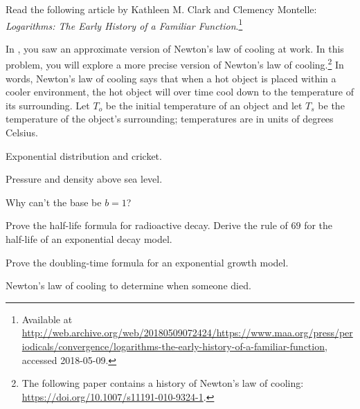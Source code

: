 \documentclass[a4paper,oneside,12pt]{article}
\begin{document}
\begin{problem}
\item Read the following article by Kathleen M. Clark and Clemency
  Montelle:
  \emph{Logarithms: The Early History of a Familiar Function}.\footnote{
    Available at
    \url{http://web.archive.org/web/20180509072424/https://www.maa.org/press/periodicals/convergence/logarithms-the-early-history-of-a-familiar-function},
    accessed 2018-05-09.
  }

\item In , you saw an approximate
  version of Newton's law of cooling at work.  In this problem, you
  will explore a more precise version of Newton's law of
  cooling.\footnote{
    The following paper contains a history of Newton's law of cooling:
    \url{https://doi.org/10.1007/s11191-010-9324-1}.
  }
  In words, Newton's law of cooling says that when a hot object is
  placed within a cooler environment, the hot object will over time
  cool down to the temperature of its surrounding.  Let $T_o$ be the
  initial temperature of an object and let $T_s$ be the temperature of
  the object's surrounding; temperatures are in units of degrees
  Celsius.

\item Exponential distribution and cricket.

\item Pressure and density above sea level.

\item Why can't the base be $b = 1$?

\item Prove the half-life formula for radioactive decay.  Derive the
  rule of $69$ for the half-life of an exponential decay model.

\item Prove the doubling-time formula for an exponential growth
  model.

\item Newton's law of cooling to determine when someone died.
\end{problem}
\end{document}
